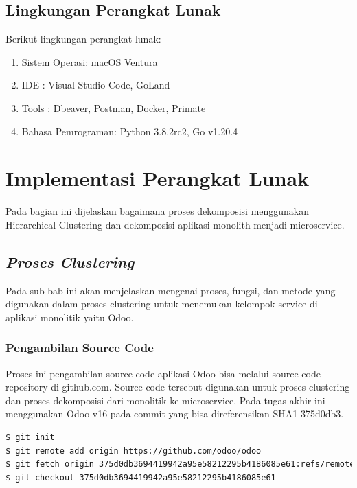 \subsection{Lingkungan Perangkat Lunak}
Berikut lingkungan perangkat lunak:

\begin{enumerate}[leftmargin=1.3cm]
	\item Sistem Operasi: macOS Ventura
	\item IDE : Visual Studio Code, GoLand 
	\item Tools : Dbeaver, Postman, Docker, Primate
	\item Bahasa Pemrograman: Python 3.8.2rc2, Go v1.20.4
\end{enumerate}

\section{Implementasi Perangkat Lunak}
Pada bagian ini dijelaskan bagaimana proses dekomposisi menggunakan Hierarchical Clustering dan dekomposisi aplikasi monolith menjadi microservice.

\subsection{\textit{Proses Clustering}}
Pada sub bab ini akan menjelaskan mengenai proses, fungsi, dan metode yang digunakan dalam proses clustering untuk menemukan kelompok service di aplikasi monolitik yaitu Odoo. \\

\subsubsection{Pengambilan Source Code}
Proses ini pengambilan source code aplikasi Odoo bisa melalui source code repository di github.com. Source code tersebut digunakan untuk proses clustering dan proses dekomposisi dari monolitik ke microservice. Pada tugas akhir ini menggunakan Odoo v16 pada commit yang bisa direferensikan SHA1 375d0db3. 
\begin{lstlisting}[style=mystyle, language=sh, caption={Shell Script Git untuk pengambilan source code}]
$ git init
$ git remote add origin https://github.com/odoo/odoo
$ git fetch origin 375d0db3694419942a95e58212295b4186085e61:refs/remotes/origin/16.0 --depth=1
$ git checkout 375d0db3694419942a95e58212295b4186085e61
\end{lstlisting} 

